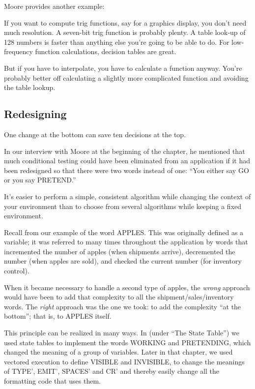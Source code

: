 \bigskip\blackline{2ex}
\noindent Moore provides another example:
\begin{tfquot}
If you want to compute trig functions, say for a graphics display, you don't
need much resolution. A seven-bit trig function is probably plenty. A table
look-up of 128 numbers is faster than anything else you're going to be able
to do. For low-frequency function calculations, decision tables are great.

But if you have to interpolate, you have to calculate a function anyway.
You're probably better off calculating a slightly more complicated function
and avoiding the table lookup.
\end{tfquot}\blackline{1ex}
\subsection{Redesigning}
\begin{tip}
One change at the bottom can save ten decisions at the top.
\end{tip}
In our interview with Moore at the beginning of the chapter, he mentioned
that much conditional testing could have been eliminated from an
application if it had been redesigned so that there were two words instead
of one: ``You either say GO or you say PRETEND.''

It's easier to perform a simple, consistent algorithm while changing
the context of your environment than to choose from several algorithms
while keeping a fixed environment.

Recall from  our example of the word APPLES. This
was originally defined as a variable; it was referred to many times
throughout the application by words that incremented the number of
apples (when shipments arrive), decremented the number (when apples are
sold), and checked the current number (for inventory control).

When it became necessary to handle a second type of apples, the
\emph{wrong} approach would have been to add that complexity to all
the shipment/\hy sales/\hy inventory words. The \emph{right} approach
was the one we took: to add the complexity ``at the bottom''; that is,
to APPLES itself.

This principle can be realized in many ways. In 
(under ``The State Table'') we used state tables to implement the words
WORKING and PRETENDING, which changed the meaning of a group
of variables. Later in that chapter, we used vectored execution to define
VISIBLE and INVISIBLE, to change the meanings of TYPE', EMIT',
SPACES' and CR' and thereby easily change all the formatting code that
uses them.

